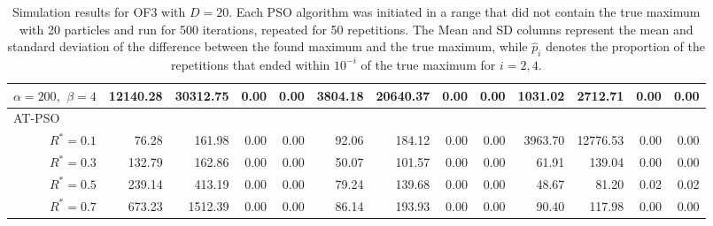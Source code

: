 \documentclass[12pt]{article}
\begin{document}
\begin{table}[ht]
{\begin{tabular}{r|rrrr|rrrr|rrrr}
  $\alpha = 200,$ $\beta =4$ & 12140.28 & 30312.75 & 0.00 & 0.00 & 3804.18 & 20640.37 & 0.00 & 0.00 & 1031.02 & 2712.71 & 0.00 & 0.00 \\ 
\hline
\multicolumn{1}{l|}{AT-PSO} &&&&&&&&&&&&\\
  $R^* = 0.1$ & 76.28 & 161.98 & 0.00 & 0.00 & 92.06 & 184.12 & 0.00 & 0.00 & 3963.70 & 12776.53 & 0.00 & 0.00 \\ 
  $R^* = 0.3$ & 132.79 & 162.86 & 0.00 & 0.00 & 50.07 & 101.57 & 0.00 & 0.00 & 61.91 & 139.04 & 0.00 & 0.00 \\ 
  $R^* = 0.5$ & 239.14 & 413.19 & 0.00 & 0.00 & 79.24 & 139.68 & 0.00 & 0.00 & 48.67 & 81.20 & 0.02 & 0.02 \\ 
  $R^* = 0.7$ & 673.23 & 1512.39 & 0.00 & 0.00 & 86.14 & 193.93 & 0.00 & 0.00 & 90.40 & 117.98 & 0.00 & 0.00 \\ 
   \hline
\end{tabular}
}
\caption{Simulation results for OF3 with $D=20$. Each PSO algorithm was initiated in a range that did not contain the true maximum with 20 particles and run for 500 iterations, repeated for 50 repetitions. The Mean and SD columns represent the mean and standard deviation of the difference between the found maximum and the true maximum, while $\widehat{p}_i$ denotes the proportion of the repetitions that ended within $10^{-i}$ of the true maximum for $i=2,4$.}
\label{tab:psosim3}
\end{table}
\end{document}
